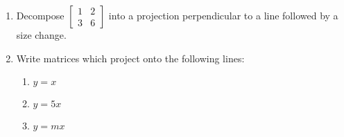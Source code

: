 \documentclass[../gatm_answers.tex]{subfiles}
\begin{document}
\begin{enumerate}
\item Decompose $\left[\begin{smallmatrix} 1 & 2 \\ 3 & 6\end{smallmatrix}\right]$ into a projection perpendicular to a line followed by a size change.
\item Write matrices which project onto the following lines:
\begin{enumerate}
\item $y=x$
\item $y=5x$
\item $y=mx$
\end{enumerate}
\vspace{-10ex}
\end{enumerate}
\end{document}
